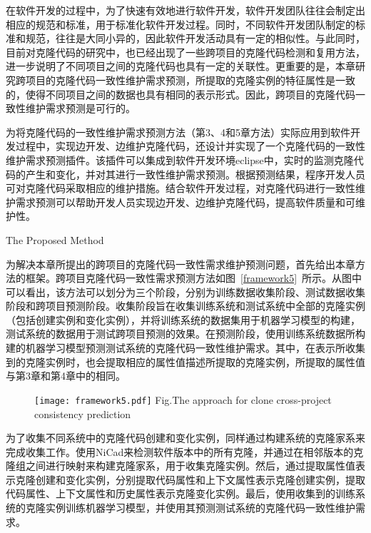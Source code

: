 在软件开发的过程中，为了快速有效地进行软件开发，软件开发团队往往会制定出相应的规范和标准，用于标准化软件开发过程。同时，不同软件开发团队制定的标准和规范，往往是大同小异的，因此软件开发活动具有一定的相似性。与此同时，目前对克隆代码的研究中，也已经出现了一些跨项目的克隆代码检测和复用方法\cite{ishihara2012inter,cheng2016feasibility}，进一步说明了不同项目之间的克隆代码也具有一定的关联性。更重要的是，本章研究跨项目的克隆代码一致性维护需求预测，所提取的克隆实例的特征属性是一致的，使得不同项目之间的数据也具有相同的表示形式。因此，跨项目的克隆代码一致性维护需求预测是可行的。

为将克隆代码的一致性维护需求预测方法（第3、4和5章方法）实际应用到软件开发过程中，实现边开发、边维护克隆代码，还设计并实现了一个克隆代码的一致性维护需求预测插件。该插件可以集成到软件开发环境eclipse中，实时的监测克隆代码的产生和变化，并对其进行一致性维护需求预测。根据预测结果，程序开发人员可对克隆代码采取相应的维护措施。结合软件开发过程，对克隆代码进行一致性维护需求预测可以帮助开发人员实现边开发、边维护克隆代码，提高软件质量和可维护性。

{The Proposed Method}

为解决本章所提出的跨项目的克隆代码一致性需求维护预测问题，首先给出本章方法的框架。跨项目克隆代码一致性需求预测方法如图~\ref{framework5}~所示。从图中可以看出，该方法可以划分为三个阶段，分别为训练数据收集阶段、测试数据收集阶段和跨项目预测阶段。收集阶段旨在收集训练系统和测试系统中全部的克隆实例（包括创建实例和变化实例），并将训练系统的数据集用于机器学习模型的构建，测试系统的数据用于测试跨项目预测的效果。在预测阶段，使用训练系统数据所构建的机器学习模型预测测试系统的克隆代码一致性维护需求。其中，在表示所收集到的克隆实例时，也会提取相应的属性值描述所提取的克隆实例，所提取的属性值与第3章和第4章中的相同。

\begin{figure}[htbp]
\centering
\texttt{[image: framework5.pdf]}
{Fig.$\!$}{The approach for clone cross-project consistency prediction}
\vspace{-1em}
\end{figure}

为了收集不同系统中的克隆代码创建和变化实例，同样通过构建系统的克隆家系来完成收集工作。使用NiCad来检测软件版本中的所有克隆，并通过在相邻版本的克隆组之间进行映射来构建克隆家系，用于收集克隆实例。然后，通过提取属性值表示克隆创建和变化实例，分别提取代码属性和上下文属性表示克隆创建实例，提取代码属性、上下文属性和历史属性表示克隆变化实例。最后，使用收集到的训练系统的克隆实例训练机器学习模型，并使用其预测测试系统的克隆代码一致性维护需求。

